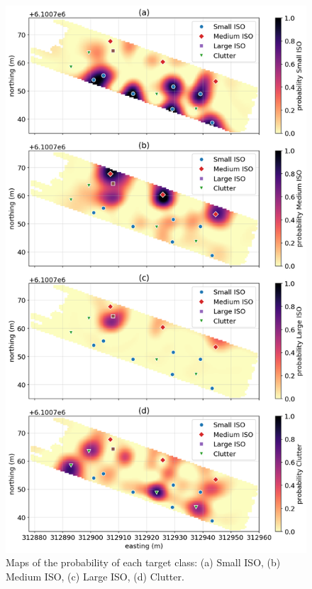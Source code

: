 \begin{figure}[htb]
    \begin{center}
    \includegraphics[width=\columnwidth]{figures/synthetic-field-probs.png}
    \end{center}
\caption{
    Maps of the probability of each target class: (a) Small ISO, (b) Medium ISO, (c) Large ISO, (d) Clutter.
}
\label{fig:synthetic-field-probs}
\end{figure}

